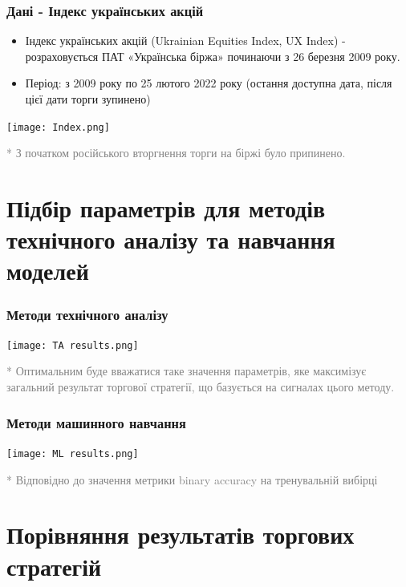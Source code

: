 \documentclass[aspectratio=169]{beamer}
\begin{document}
\begin{frame}
\frametitle{Дані - Індекс  українських  акцій}
\begin{center}
\begin{itemize}
\item \alert {Індекс  українських  акцій}  (Ukrainian  Equities  Index,  UX  Index) - розраховується ПАТ «Українська біржа» починаючи з 26 березня 2009 року.
\smallskip
\item  \alert {Період:} з 2009 року по 25 лютого 2022 року (остання доступна дата, після цієї дати 
торги  зупинено)
\end{itemize}
\tinyskip
\texttt{[image: Index.png]}
\tinyskip
\end{center}
\scriptsize \textcolor{gray}{* З  початком  російського  вторгнення  торги  на  біржі було  припинено.} 
\end{frame}

\section{Підбір параметрів для методів технічного аналізу та навчання моделей}

\begin{frame}
\frametitle{Методи технічного аналізу}
\begin{center}
\texttt{[image: TA results.png]}
\end{center}
\scriptsize \textcolor{gray}{* Оптимальним буде вважатися таке значення параметрів, яке максимізує  загальний  результат  торгової  стратегії, що  базується  на  сигналах цього методу.}
\end{frame}

\begin{frame}
\frametitle{Методи машинного навчання}
\begin{center}
\texttt{[image: ML results.png]}
\end{center}
\scriptsize \textcolor{gray}{* Відповідно до значення метрики  binary accuracy на тренувальній вибірці}
\end{frame}

\section{Порівняння результатів торгових стратегій}
\end{document}
